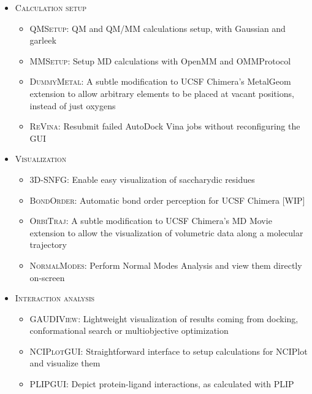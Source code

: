 \begin{itemize}
	\item \textsc{Calculation setup}

	\begin{itemize}
		\item \textsc{QMSetup}: QM and QM/MM calculations setup, with Gaussian and garleek

		\item \textsc{MMSetup}: Setup MD calculations with OpenMM and OMMProtocol

		\item \textsc{DummyMetal}: A subtle modification to UCSF Chimera’s MetalGeom extension to allow arbitrary elements to be placed at vacant positions, instead of just oxygens

		\item \textsc{ReVina}: Resubmit failed AutoDock Vina jobs without reconfiguring the GUI
	\end{itemize}

	\item \textsc{Visualization }
	\begin{itemize}
		\item \textsc{3D-SNFG}: Enable easy visualization of saccharydic residues

		\item \textsc{BondOrder}: Automatic bond order perception for UCSF Chimera [WIP]

		\item \textsc{OrbiTraj}: A subtle modification to UCSF Chimera’s MD Movie extension to allow the visualization of volumetric data along a molecular trajectory

		\item \textsc{NormalModes}: Perform Normal Modes Analysis and view them directly on-screen
	\end{itemize}

	\item \textsc{Interaction analysis}

	\begin{itemize}
		\item \textsc{GAUDIView}: Lightweight visualization of results coming from docking, conformational search or multiobjective optimization

		\item \textsc{NCIPlotGUI}: Straightforward interface to setup calculations for NCIPlot and visualize them

		\item \textsc{PLIPGUI}: Depict protein-ligand interactions, as calculated with PLIP
	\end{itemize}


\end{itemize}
